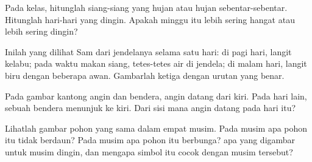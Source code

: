 \begin{exercise}[$\star\star$]\label{exo:g1:watching-the-weather:8}
Pada  kelas, hitunglah siang-siang yang hujan atau hujan
sebentar-sebentar. Hitunglah hari-hari yang dingin. Apakah minggu itu
lebih sering hangat atau lebih sering dingin?
\end{exercise}

\begin{exercise}[$\star\star$]\label{exo:g1:watching-the-weather:9}
Inilah yang dilihat Sam dari jendelanya selama satu hari: di pagi hari,
langit kelabu; pada waktu makan siang, tetes-tetes air di jendela; di malam
hari, langit biru dengan beberapa awan. Gambarlah ketiga 
dengan urutan yang benar.
\end{exercise}

\begin{exercise}[$\star\star$]\label{exo:g1:watching-the-weather:10}
Pada gambar kantong angin dan bendera, angin datang dari kiri. Pada hari
lain, sebuah bendera menunjuk ke kiri. Dari sisi mana angin datang pada
hari itu?
\end{exercise}

\begin{exercise}[$\star\star$]\label{exo:g1:watching-the-weather:11}
Lihatlah gambar pohon yang sama dalam empat musim. Pada musim apa pohon
itu tidak berdaun? Pada musim apa pohon itu berbunga?  apa
yang digambar untuk musim dingin, dan mengapa simbol itu cocok dengan
musim tersebut?
\end{exercise}
